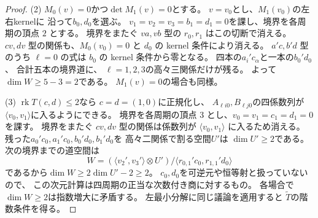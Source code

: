 \begin{proof}
(2) $M_0(v)=0$かつ$\det M_1(v)=0$とする。
$v=v_0$とし、$M_1(v_0)$の左右kernelに
沿って$b_0,d_0$を選ぶ。
$v_1=v_2=v_3=b_1=d_1=0$を課し、境界を各周期の頂点 $2$ とする。
境界をまたぐ $v a,v b$ 型の $r_0,r_1$ はこの切断で消える。
$c v,d v$ 型の関係も、$M_0(v_0)=0$ と
$d_0$ の kernel 条件により消える。
$a'c,b'd$ 型のうち $\ell=0$ の式は $b_0$ の kernel 条件から零となる。
四本の$a_i'c_\alpha$と一本の$b_0'd_0$、
合計五本の境界道に、
$\ell=1,2,3$の高々三関係だけが残る。
よって$\dim W\ge5-3=2$である。
$M_1(v)=0$の場合も同様。

(3) $\operatorname{rk}T(c,d)\le2$なら
$c=d=(1,0)$に正規化し、
$A_{\ell i0},B_{\ell j0}$の四係数列が
$\langle v_0,v_1\rangle$に入るようにできる。
境界を各周期の頂点 $3$ とし、$v_0=v_1=c_1=d_1=0$を課す。
境界をまたぐ $c v,d v$ 型の関係は係数列が
$\langle v_0,v_1\rangle$ に入るため消える。
残った$a_0'c_0,a_1'c_0,b_0'd_0,b_1'd_0$を
高々二関係で割る空間$U'$は
$\dim U'\ge2$である。
次の境界までの道空間は
\[
 W=(\langle v_2',v_3'\rangle\otimes U')/
       \langle r_{0,1}'c_0,r_{1,1}'d_0\rangle
\]
であるから$\dim W\ge2\dim U'-2\ge2$。
$c_0,d_0$を可逆元や恒等射と扱っていないので、
この次元計算は四周期の正当な次数付き商に対するもの。
各場合で$\dim W\ge2$は指数増大に矛盾する。
左最小分解に同じ議論を適用すると
$\widetilde T$の階数条件を得る。
\end{proof}

